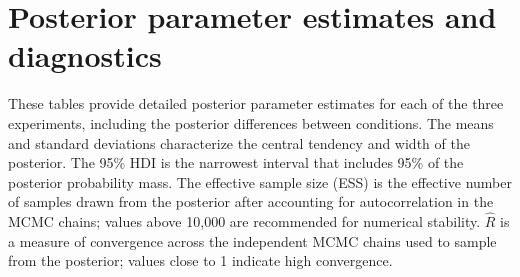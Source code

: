 \documentclass[doc,biblatex]{apa7}
\begin{document}
\clearpage

\section{Posterior parameter estimates and diagnostics}

These tables provide detailed posterior parameter estimates for each of the three experiments, including the posterior differences between conditions. The means and standard deviations characterize the central tendency and width of the posterior. The 95\% HDI is the narrowest interval that includes 95\% of the posterior probability mass. The effective sample size (ESS) is the effective number of samples drawn from the posterior after accounting for autocorrelation in the MCMC chains; values above 10,000 are recommended for numerical stability. $\hat{R}$ is a measure of convergence across the independent MCMC chains used to sample from the posterior; values close to 1 indicate high convergence.
\end{document}
